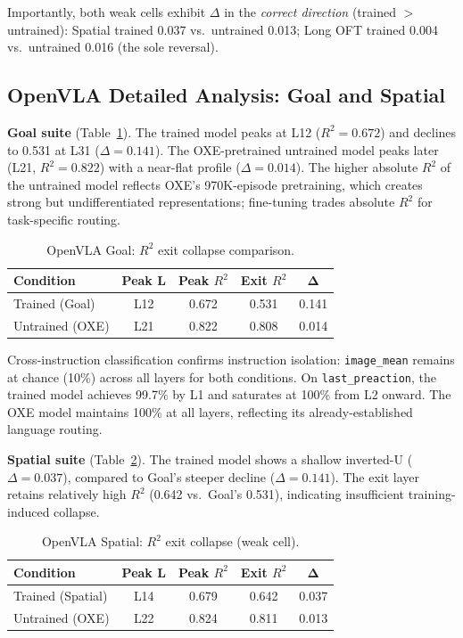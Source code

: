 \documentclass[10pt,twocolumn]{article}
\begin{document}
Importantly, both weak cells exhibit $\Delta$ in the \emph{correct direction} (trained $>$ untrained): Spatial trained 0.037 vs.\ untrained 0.013; Long OFT trained 0.004 vs.\ untrained 0.016 (the sole reversal).

\subsection{OpenVLA Detailed Analysis: Goal and Spatial}
\label{sec:openvla_detail}

\textbf{Goal suite} (Table~\ref{tab:openvla_goal_r2}).
The trained model peaks at L12 ($R^2 = 0.672$) and declines to 0.531 at L31 ($\Delta = 0.141$). The OXE-pretrained untrained model peaks later (L21, $R^2 = 0.822$) with a near-flat profile ($\Delta = 0.014$). The higher absolute $R^2$ of the untrained model reflects OXE's 970K-episode pretraining, which creates strong but undifferentiated representations; fine-tuning trades absolute $R^2$ for task-specific routing.

\begin{table}[t]
\centering
\caption{OpenVLA Goal: $R^2$ exit collapse comparison.}
\label{tab:openvla_goal_r2}
\small
\begin{tabular}{@{}lcccc@{}}
\toprule
\textbf{Condition} & \textbf{Peak L} & \textbf{Peak $R^2$} & \textbf{Exit $R^2$} & $\boldsymbol{\Delta}$ \\
\midrule
Trained (Goal) & L12 & 0.672 & 0.531 & 0.141 \\
Untrained (OXE) & L21 & 0.822 & 0.808 & 0.014 \\
\bottomrule
\end{tabular}
\end{table}

Cross-instruction classification confirms instruction isolation: \texttt{image\_mean} remains at chance (10\%) across all layers for both conditions. On \texttt{last\_preaction}, the trained model achieves 99.7\% by L1 and saturates at 100\% from L2 onward. The OXE model maintains 100\% at all layers, reflecting its already-established language routing.

\textbf{Spatial suite} (Table~\ref{tab:openvla_spatial_r2}).
The trained model shows a shallow inverted-U ($\Delta = 0.037$), compared to Goal's steeper decline ($\Delta = 0.141$). The exit layer retains relatively high $R^2$ (0.642 vs.\ Goal's 0.531), indicating insufficient training-induced collapse.

\begin{table}[t]
\centering
\caption{OpenVLA Spatial: $R^2$ exit collapse (weak cell).}
\label{tab:openvla_spatial_r2}
\small
\begin{tabular}{@{}lcccc@{}}
\toprule
\textbf{Condition} & \textbf{Peak L} & \textbf{Peak $R^2$} & \textbf{Exit $R^2$} & $\boldsymbol{\Delta}$ \\
\midrule
Trained (Spatial) & L14 & 0.679 & 0.642 & 0.037 \\
Untrained (OXE) & L22 & 0.824 & 0.811 & 0.013 \\
\bottomrule
\end{tabular}
\end{table}
\end{document}
